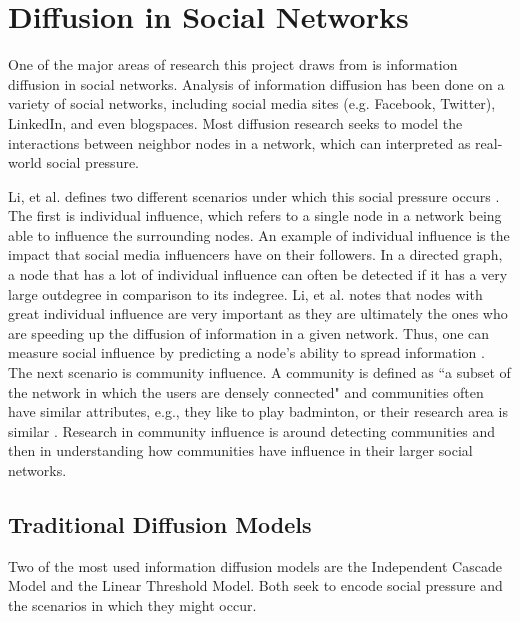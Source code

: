 \section{Diffusion in Social Networks} \label{ch:diffusion}
One of the major areas of research this project draws from is information diffusion in social networks.  Analysis of information diffusion has been done on a variety of social networks, including social media sites (e.g. Facebook, Twitter), LinkedIn, and even blogspaces.  Most diffusion research seeks to model the interactions between neighbor nodes in a network, which can interpreted as real-world social pressure.

Li, et al. defines two different scenarios under which this social pressure occurs \cite{lisurvey}.  The first is individual influence, which refers to a single node in a network being able to influence the surrounding nodes.  An example of individual influence is the impact that social media influencers have on their followers.  In a directed graph, a node that has a lot of individual influence can often be detected if it has a very large outdegree in comparison to its indegree.  Li, et al. notes that nodes with great individual influence are very important as they are ultimately the ones who are speeding up the diffusion of information in a given network.  Thus, one can measure social influence by predicting a node's ability to spread information \cite{lisurvey}.  The next scenario is community influence.  A community is defined as ``a subset of the network in which the users are densely connected" and communities often have similar attributes, e.g., they like to play badminton, or their research area is similar \cite{lisurvey}.  Research in community influence is around detecting communities and then in understanding how communities have influence in their larger social networks.
\subsection{Traditional Diffusion Models}
Two of the most used information diffusion models are the Independent Cascade Model and the Linear Threshold Model.  Both seek to encode social pressure and the scenarios in which they might occur.
